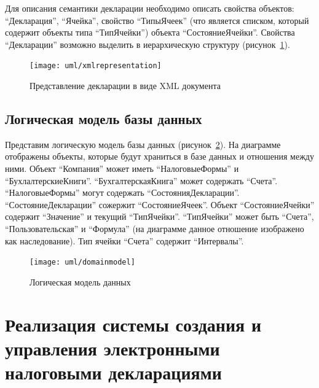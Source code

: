 \documentclass[14pt,a4paper]{reportmod}
\begin{document}
Для описания семантики декларации необходимо описать свойства объектов: ``Декларация'', ``Ячейка'', свойство ``ТипыЯчеек'' (что является списком, который содержит объекты типа ``ТипЯчейки'') объекта ``СостояниеЯчейки''. Свойства ``Декларации'' возможно выделить в иерархическую структуру (рисунок~\ref{pic:xmlrepresentation}).

\begin{figure}
  \centering
  \texttt{[image: uml/xmlrepresentation]}
  \caption{Представление декларации в виде XML документа}
  \label{pic:xmlrepresentation}
\end{figure}

\section{Логическая модель базы данных}
Представим логическую модель базы данных (рисунок~\ref{pic:domain_model}). На диаграмме отображены объекты, которые будут храниться в базе данных и отношения между ними. Объект ``Компания'' может иметь ``НалоговыеФормы'' и ``БухлалтерскиеКниги''. ``БухгалтерскаяКнига'' может содержать ``Счета''. ``НалоговыеФормы'' могут содержать ``СостоянияДекларации''. ``СостояниеДекларации'' сожержит ``СостояниеЯчеек''. Объект ``СостояниеЯчейки'' содержит ``Значение'' и текущий ``ТипЯчейки''. ``ТипЯчейки'' может быть ``Счета'', ``Пользовательская'' и ``Формула'' (на диаграмме данное отношение изображено как наследование). Тип ячейки ``Счета'' содержит ``Интервалы''.

\begin{figure}
  \centering
  \texttt{[image: uml/domainmodel]}
  \caption{Логическая модель данных}
  \label{pic:domain_model}
\end{figure}

\chapter{Реализация системы создания и управления электронными налоговыми декларациями}
\end{document}
